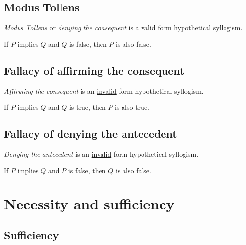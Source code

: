 \documentclass[a4paper]{article}
\begin{document}
\subsection{Modus Tollens}

\textit{Modus Tollens} or \textit{denying the consequent}
is a \underline{valid} form hypothetical syllogism.

\begin{prooftree}
\end{prooftree}

If \(P\) implies \(Q\) and \(Q\) is false, then \(P\) is also false.

\subsection{Fallacy of affirming the consequent}

\textit{Affirming the consequent}
is an \underline{invalid} form hypothetical syllogism.

\begin{prooftree}
\end{prooftree}

If \(P\) implies \(Q\) and \(Q\) is true, then \(P\) is also true.

\subsection{Fallacy of denying the antecedent}

\textit{Denying the antecedent}
is an \underline{invalid} form hypothetical syllogism.

\begin{prooftree}
\end{prooftree}

If \(P\) implies \(Q\) and \(P\) is false, then \(Q\) is also false.

\pagebreak

\section{Necessity and sufficiency}

\subsection{Sufficiency}
\end{document}
